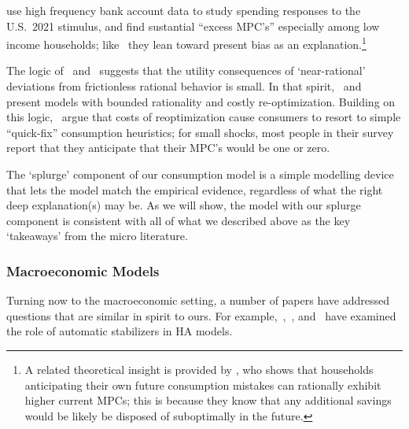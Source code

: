 \documentclass[\PathToRoot/\ProjectName]{subfiles}
\begin{document}
\cite{indarte2024explains} use high frequency bank account data to study spending responses to the U.S.\ 2021 stimulus, and find sustantial ``excess MPC's'' especially among low income households; like~\cite{lmmPresentBias} they lean toward present bias as an explanation.\footnote{A related theoretical insight is provided by \cite{Lian2023-ca}, who shows that households anticipating their own future consumption mistakes can rationally exhibit higher current MPCs; this is because they know that any additional savings would be likely be disposed of suboptimally in the future.}

The logic of~\cite{akerlof1985near} and~\cite{cochrane1989sensitivity} suggests that the utility consequences of `near-rational' deviations from frictionless rational behavior is small.
In that spirit,~\cite{BoutrosWindfall} and~\cite{ilutEconomic} present models with bounded rationality and costly re-optimization.  Building on this logic,~\cite{ansQuickfix} argue that costs of reoptimization cause consumers to resort to simple ``quick-fix'' consumption heuristics; for small shocks, most people in their survey report that they anticipate that their MPC's would be one or zero.

The `splurge' component of our consumption model is a simple modelling device that lets the model match the empirical evidence, regardless of what the right deep explanation(s) may be. As we will show, the model with our splurge component is consistent with all of what we described above as the key `takeaways' from the micro literature.

\whenintegrated{\label{macroeconomic-models}}
\subsubsection{Macroeconomic Models}
Turning now to the macroeconomic setting, a number of papers have addressed questions that are similar in spirit to ours.  For example,~\cite{mckay2016role},~\cite{mckay2021optimal}, and~\cite{phan2024welfare} have examined the role of automatic stabilizers in HA models.
\end{document}
